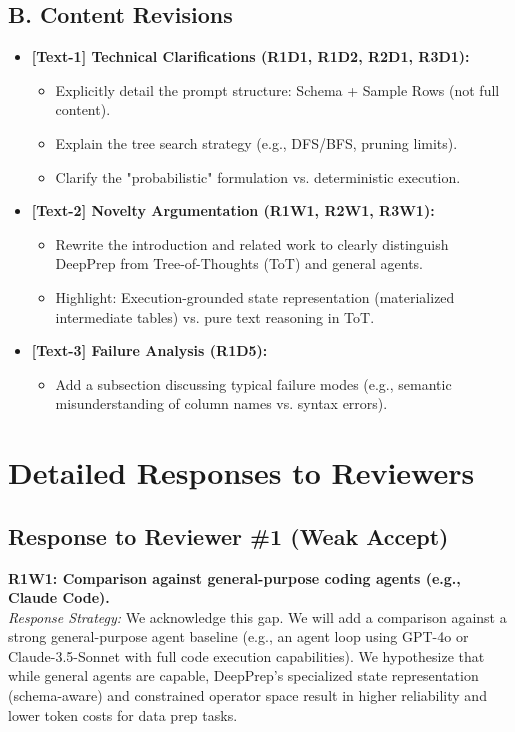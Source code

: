 \subsection*{B. Content Revisions}
\begin{itemize}
    \item \textbf{[Text-1] Technical Clarifications (R1D1, R1D2, R2D1, R3D1):}
    \begin{itemize}
        \item Explicitly detail the prompt structure: Schema + Sample Rows (not full content).
        \item Explain the tree search strategy (e.g., DFS/BFS, pruning limits).
        \item Clarify the "probabilistic" formulation vs. deterministic execution.
    \end{itemize}
    
    \item \textbf{[Text-2] Novelty Argumentation (R1W1, R2W1, R3W1):}
    \begin{itemize}
        \item Rewrite the introduction and related work to clearly distinguish DeepPrep from Tree-of-Thoughts (ToT) and general agents.
        \item Highlight: Execution-grounded state representation (materialized intermediate tables) vs. pure text reasoning in ToT.
    \end{itemize}
    
    \item \textbf{[Text-3] Failure Analysis (R1D5):}
    \begin{itemize}
        \item Add a subsection discussing typical failure modes (e.g., semantic misunderstanding of column names vs. syntax errors).
    \end{itemize}
\end{itemize}

\newpage

\section{Detailed Responses to Reviewers}

\subsection*{Response to Reviewer \#1 (Weak Accept)}

\noindent \textbf{R1W1: Comparison against general-purpose coding agents (e.g., Claude Code).} \\
\textit{Response Strategy:} We acknowledge this gap. We will add a comparison against a strong general-purpose agent baseline (e.g., an agent loop using GPT-4o or Claude-3.5-Sonnet with full code execution capabilities). We hypothesize that while general agents are capable, DeepPrep's specialized state representation (schema-aware) and constrained operator space result in higher reliability and lower token costs for data prep tasks.

